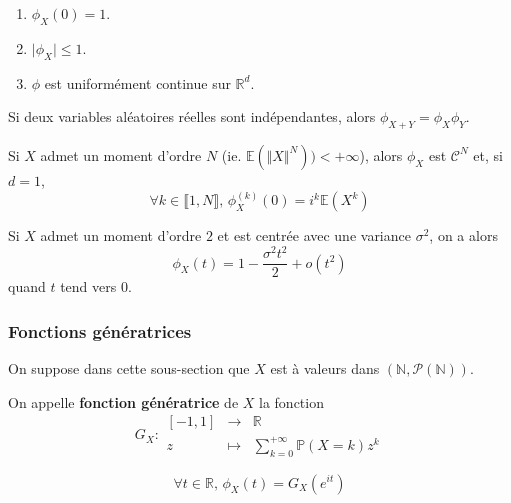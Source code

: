   \begin{theorem}
    \begin{enumerate}[label=(\roman*)]
      \item $\phi_X(0) = 1$.
      \item $\vert \phi_X \vert \leq 1$.
      \item $\phi$ est uniformément continue sur $\mathbb{R}^d$.
    \end{enumerate}
  \end{theorem}

  \begin{proposition}
    Si deux variables aléatoires réelles sont indépendantes, alors $\phi_{X+Y} = \phi_X \phi_Y$.
  \end{proposition}

  \begin{theorem}
    Si $X$ admet un moment d'ordre $N$ (ie. $\mathbb{E}(\Vert X \Vert^N)) < +\infty$), alors $\phi_X$ est $\mathcal{C}^N$ et, si $d = 1$,
    \[ \forall k \in \llbracket 1, N \rrbracket, \, \phi_X^{(k)}(0) = i^k \mathbb{E}(X^k) \]
  \end{theorem}

  \begin{example}
    Si $X$ admet un moment d'ordre $2$ et est centrée avec une variance $\sigma^2$, on a alors
    \[ \phi_X(t) = 1 - \frac{\sigma^2 t^2}{2} + o(t^2) \]
    quand $t$ tend vers $0$.
  \end{example}

  \subsubsection{Fonctions génératrices}

  On suppose dans cette sous-section que $X$ est à valeurs dans $(\mathbb{N}, \mathcal{P}(\mathbb{N}))$.


  \begin{definition}
    On appelle \textbf{fonction génératrice} de $X$ la fonction
    \[
    G_X :
    \begin{array}{ccc}
      [-1,1] &\rightarrow& \mathbb{R} \\
      z &\mapsto& \sum_{k=0}^{+\infty} \mathbb{P}(X=k) z^k
    \end{array}
    \]
  \end{definition}


  \begin{remark}
    \[ \forall t \in \mathbb{R}, \, \phi_X(t) = G_X(e^{it}) \]
  \end{remark}

